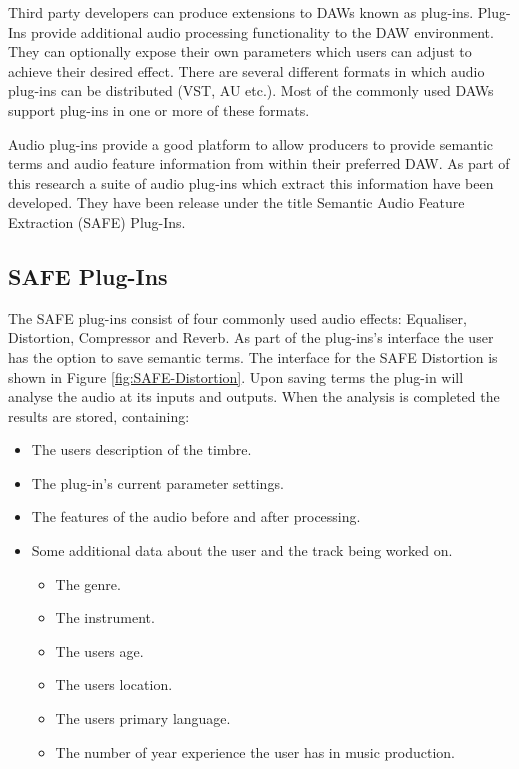 		Third party developers can produce extensions to DAWs known as plug-ins. Plug-Ins provide additional audio
		processing functionality to the DAW environment. They can optionally expose their own parameters which users
		can adjust to achieve their desired effect. There are several different formats in which audio plug-ins can
		be distributed (VST, AU etc.). Most of the commonly used DAWs support plug-ins in one or more of these
		formats.

		Audio plug-ins provide a good platform to allow producers to provide semantic terms and audio feature
		information from within their preferred DAW. As part of this research a suite of audio plug-ins which
		extract this information have been developed. They have been release under the title Semantic Audio Feature
		Extraction (SAFE) Plug-Ins.

	\subsection{SAFE Plug-Ins}
		The SAFE plug-ins consist of four commonly used audio effects: Equaliser, Distortion, Compressor and Reverb.
		As part of the plug-ins's interface the user has the option to save semantic terms. The interface for the
		SAFE Distortion is shown in Figure \ref{fig:SAFE-Distortion}. Upon saving terms the plug-in will analyse the
		audio at its inputs and outputs. When the analysis is completed the results are stored, containing:

		\begin{itemize}
			\item The users description of the timbre.
			\item The plug-in's current parameter settings.
			\item The features of the audio before and after processing.
			\item Some additional data about the user and the track being worked on.
			\begin{itemize}
				\item The genre.
				\item The instrument.
				\item The users age.
				\item The users location.
				\item The users primary language.
				\item The number of year experience the user has in music production.
			\end{itemize}
		\end{itemize}

